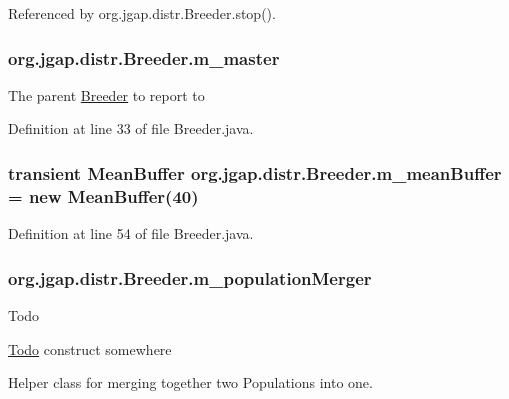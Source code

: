 Referenced by org.\-jgap.\-distr.\-Breeder.\-stop().

\hypertarget{classorg_1_1jgap_1_1distr_1_1_breeder_a75f60c6d46054aa34fed05f6a6d6d058}{
\subsubsection[{m\-\_\-master}]{ org.\-jgap.\-distr.\-Breeder.\-m\-\_\-master\hspace{0.3cm}{\ttfamily [private]}}}\label{classorg_1_1jgap_1_1distr_1_1_breeder_a75f60c6d46054aa34fed05f6a6d6d058}
The parent \hyperlink{classorg_1_1jgap_1_1distr_1_1_breeder}{Breeder} to report to 

Definition at line 33 of file Breeder.\-java.

\hypertarget{classorg_1_1jgap_1_1distr_1_1_breeder_afdbe7d0bf0133cb06ec341749d04eccf}{
\subsubsection[{m\-\_\-mean\-Buffer}]{\setlength{\rightskip}{0pt plus 5cm}transient Mean\-Buffer org.\-jgap.\-distr.\-Breeder.\-m\-\_\-mean\-Buffer = new Mean\-Buffer(40)\hspace{0.3cm}{\ttfamily [private]}}}\label{classorg_1_1jgap_1_1distr_1_1_breeder_afdbe7d0bf0133cb06ec341749d04eccf}


Definition at line 54 of file Breeder.\-java.

\hypertarget{classorg_1_1jgap_1_1distr_1_1_breeder_a7ed056f076614c9e220460f107259c5a}{
\subsubsection[{m\-\_\-population\-Merger}]{ org.\-jgap.\-distr.\-Breeder.\-m\-\_\-population\-Merger\hspace{0.3cm}{\ttfamily [private]}}}\label{classorg_1_1jgap_1_1distr_1_1_breeder_a7ed056f076614c9e220460f107259c5a}
\begin{DoxyRefDesc}{Todo}
\item[\hyperlink{todo__todo000058}{Todo}]construct somewhere \end{DoxyRefDesc}
Helper class for merging together two Populations into one. 

